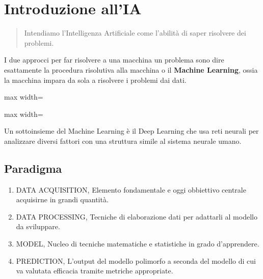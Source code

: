 \section{Introduzione all'IA}
\begin{quotation}
	Intendiamo l'Intelligenza Artificiale come l'abilità di saper risolvere dei problemi.
\end{quotation}
I due approcci per far risolvere a una macchina un problema sono dire esattamente la procedura risolutiva alla macchina o il \textbf{Machine Learning}, ossia la macchina impara da sola a risolvere i problemi dai dati.
\begin{center}
	\begin{minipage}{0.48\textwidth}
		\begin{adjustbox}{max width=\linewidth}
		\end{adjustbox}
	\end{minipage}
	\hfill
	\begin{minipage}{0.48\textwidth}
		\begin{adjustbox}{max width=\linewidth}
		\end{adjustbox}
	\end{minipage}
\end{center}
Un sottoinsieme del Machine Learning è il Deep Learning che usa reti neurali per analizzare diversi fattori con una struttura simile al sistema neurale umano.
\subsection{Paradigma}
\begin{enumerate}
	\item DATA ACQUISITION, Elemento fondamentale e oggi obbiettivo centrale acquisirne in grandi quantità.
	\item DATA PROCESSING, Tecniche di elaborazione dati per adattarli al modello da sviluppare.
	\item MODEL, Nucleo di tecniche matematiche e statistiche in grado d'apprendere.
	\item PREDICTION, L'output del modello polimorfo a seconda del modello di cui va valutata efficacia tramite metriche appropriate.
\end{enumerate}
